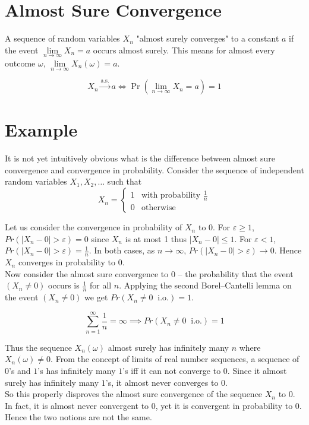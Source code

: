 \section{Almost Sure Convergence}
A sequence of random variables \(X_n\) "almost surely converges" to a constant \(a\) if the event 
$\lim\limits_{n\to\infty}X_n=a$ occurs almost surely. This means for almost every 
outcome $\omega$, $\lim\limits_{n\to\infty}X_n(\omega)=a$. 

\[
X_n\xrightarrow{\mathrm{a.s.}}a \iff
\Pr\!\left(
\lim\limits_{n\to\infty}X_n=a
\right)=1
\]

\section*{Example}
\noindent It is not yet intuitively obvious what is the difference between almost sure convergence and 
convergence in probability. Consider the sequence of independent random variables $X_1,X_2,\ldots$ such that 
\[
X_n 
= 
\begin{cases}
1 & \text{with probability }\frac{1}{n}\\
0 & \text{otherwise}
\end{cases}
\]

Let us consider the convergence in probability of $X_n$ to 0. For $\varepsilon \ge 1$, 
$Pr(|X_n-0|>\varepsilon)=0$ since $X_n$ is at most 1 thus $|X_n-0|\le 1$. For $\varepsilon < 1$, 
$Pr(|X_n-0|>\varepsilon)=\frac{1}{n}$. In both cases, as $n \to \infty$, $Pr(|X_n-0|>\varepsilon)\to 0$.
Hence $X_n$ converges in probability to 0.\\


\noindent Now consider the almost sure convergence to 0 -- the probability that the event $(X_n \neq 0)$ 
occurs is $\frac{1}{n}$ for all $n$. Applying the second Borel--Cantelli lemma 
on the event $(X_n \neq 0)$ we get $Pr(X_n \neq 0 \;\; \mathrm{i.o.})=1$.

\[
\sum_{n=1}^{\infty}\frac{1}{n}=\infty \implies Pr(X_n \neq 0 \;\; \mathrm{i.o.})=1
\] 


\noindent Thus the sequence $X_n(\omega)$ almost surely has infinitely many $n$ where $X_n(\omega)\neq 0$. 
From the concept of limits of real number sequences, a sequence of $0$'s and $1$'s has infinitely many $1$'s 
iff it can not converge to $0$. Since it almost surely has infinitely many $1$'s, it almost 
never converges to $0$.\\


\noindent So this properly disproves the almost sure convergence of the sequence $X_n$ to 0. In fact, it is almost 
never convergent to 0, yet it is convergent in probability to 0. Hence the two notions are not the same.\\



